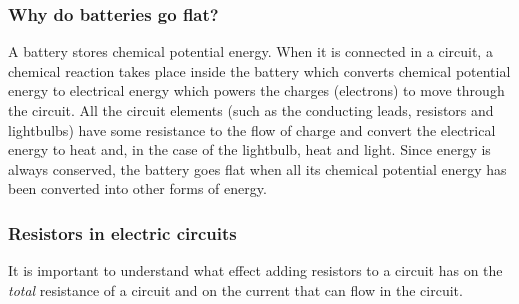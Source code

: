             \subsubsection{ Why do batteries go flat?}
            \nopagebreak
          \label{m38776*id67413}A battery stores chemical potential energy. When it is connected in a circuit, a chemical reaction takes place inside the battery which converts chemical potential energy to electrical energy which powers the charges (electrons) to move through the circuit. All the circuit elements (such as the conducting leads, resistors and lightbulbs) have some resistance to the flow of charge and convert the electrical energy to heat and, in the case of the lightbulb, heat and light.
Since energy is always conserved, the battery goes flat when all its chemical potential energy has been converted into other forms of energy.\par 
      \label{m38776*uid65}
            \subsubsection{ Resistors in electric circuits}
            \nopagebreak
        \label{m38776*id67431}It is important to understand what effect adding resistors to a circuit has on the \textsl{total} resistance of a circuit and on the current that can flow in the circuit.\par 
        \label{m38776*uid66}
